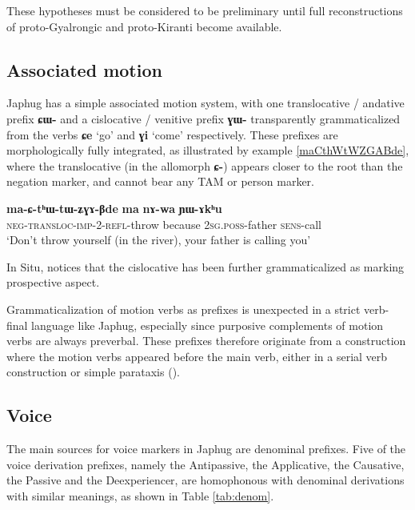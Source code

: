 \documentclass[oldfontcommands,oneside,a4paper,11pt]{article}
\newcommand{\ipa}[1]{\mbox{\phon\textbf{#1}}} %
\begin{document}
These hypotheses must be considered to be preliminary until full reconstructions of proto-Gyalrongic and proto-Kiranti become available.

\subsection{Associated motion} \label{sec:motion}
Japhug has a simple associated motion system, with one translocative / andative prefix \ipa{ɕɯ-} and a cislocative / venitive prefix \ipa{ɣɯ-} transparently grammaticalized from the verbs \ipa{ɕe} `go' and \ipa{ɣi} `come' respectively. These prefixes are morphologically fully integrated, as illustrated by example \ref{maCthWtWZGABde}, where the translocative (in the allomorph \ipa{ɕ-}) appears closer to the root than the negation marker, and cannot bear any TAM or person marker.  

\begin{exe}
\ex \label{maCthWtWZGABde}
\gll \ipa{ma-ɕ-tʰɯ-tɯ-ʑɣɤ-βde} 	\ipa{ma} 	\ipa{nɤ-wa} 	\ipa{ɲɯ-ɤkʰu}   \\
\textsc{neg-transloc-imp-2-refl}-throw because \textsc{2sg.poss}-father \textsc{sens}-call \\
\glt `Don't throw yourself (in the river), your father is calling you' 
\end{exe}

In Situ, \citet{youjing03zhuokeji} notices that the cislocative has been further grammaticalized as marking prospective aspect.

Grammaticalization of motion verbs as prefixes is unexpected in a strict verb-final language like Japhug, especially since purposive complements of motion verbs are always preverbal. These prefixes therefore originate from a construction where the motion verbs appeared before the main verb, either in a serial verb construction or simple parataxis (\citealt{jacques13harmonization}).

\subsection{Voice} \label{sec:voice}
The main sources for voice markers in Japhug are denominal prefixes. Five of the voice derivation prefixes, namely the Antipassive, the Applicative, the Causative, the Passive and the Deexperiencer, are homophonous with denominal derivations with similar meanings, as shown in Table \ref{tab:denom}.
\end{document}
